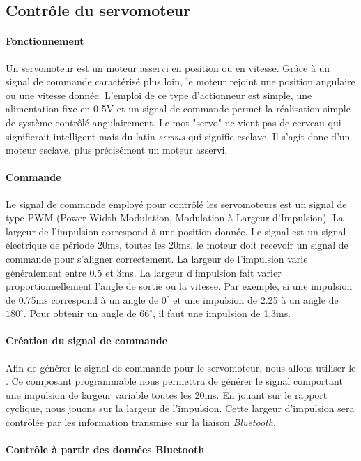 			\subsection{Contrôle du servomoteur}
			\paragraph{Fonctionnement}
			Un servomoteur est un moteur asservi en position ou en vitesse. Grâce à un signal de commande caractérisé plus loin, le moteur rejoint une position angulaire ou une vitesse donnée. L'emploi de ce type d'actionneur est simple, une alimentation fixe en 0-5V et un signal de commande permet la réalisation simple de système contrôlé angulairement. Le mot "servo" ne vient pas de cerveau qui signifierait intelligent mais du latin \emph{servus} qui signifie esclave. Il s'agit donc d'un moteur esclave, plus précisément un moteur asservi.
			
			\paragraph{Commande}Le signal de commande employé pour contrôlé les servomoteurs est un signal de type PWM (Power Width Modulation, Modulation à Largeur d'Impulsion). La largeur de l'impulsion correspond à une position donnée. Le signal est un signal électrique de période 20ms, toutes les 20ms, le moteur doit recevoir un signal de commande pour s'aligner correctement. La largeur de l'impulsion varie généralement entre 0.5 et 3ms. La largeur d'impulsion fait varier proportionnellement l'angle de sortie ou la vitesse. Par exemple, si une impulsion de 0.75ms correspond à un angle de $0^{\circ}$ et une impulsion de 2.25 à un angle de $180^{\circ}$. Pour obtenir un angle de $66^{\circ}$, il faut une impulsion de 1.3ms.  
			
			\paragraph{Création du signal de commande} 
			Afin de générer le signal de commande pour le servomoteur, nous allons utiliser le \pic. Ce composant programmable nous permettra de générer le signal comportant une impulsion de largeur variable toutes les 20ms. En jouant sur le rapport cyclique, nous jouons sur la largeur de l'impulsion. Cette largeur d'impulsion sera contrôlée par les information transmise sur la liaison \textit{Bluetooth}. 
			\paragraph{Contrôle à partir des données Bluetooth}
			
